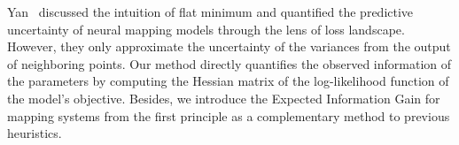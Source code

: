 Yan~\etal\cite{yan2023active-neural-mapping} discussed the intuition of flat minimum and quantified the predictive uncertainty of neural mapping models through the lens of loss landscape. However, they only approximate the uncertainty of the variances from the output of neighboring points. Our method directly quantifies the observed information of the parameters by computing the Hessian matrix of the log-likelihood function of the model's objective.
Besides, we introduce the Expected Information Gain for mapping systems from the first principle as a complementary method to previous heuristics. 
